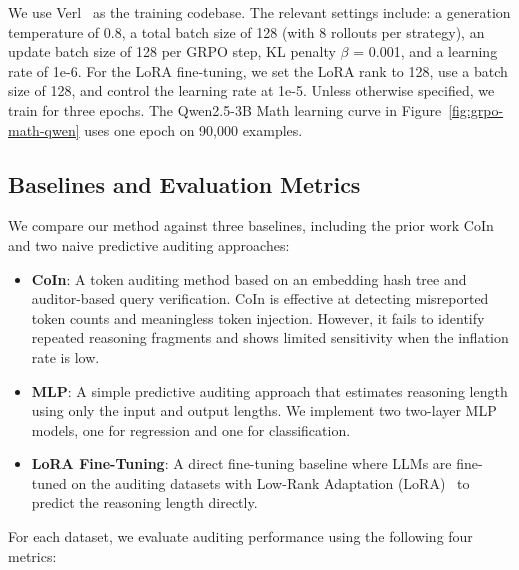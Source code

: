 \documentclass[pdflatex,sn-mathphys-num]{sn-jnl}%
\theoremstyle{thmstyleone}%
\theoremstyle{thmstyletwo}%
\theoremstyle{thmstylethree}%
\begin{document}
We use Verl~\citep{sheng2024hybridflow} as the training codebase. The relevant settings include: a generation temperature of 0.8, a total batch size of 128 (with 8 rollouts per strategy), an update batch size of 128 per GRPO step, KL penalty $\beta$ = 0.001, and a learning rate of 1e-6. 
For the LoRA fine-tuning, we set the LoRA rank to 128, use a batch size of 128, and control the learning rate at 1e-5.
Unless otherwise specified, we train for three epochs. The Qwen2.5-3B Math learning curve in Figure~\ref{fig:grpo-math-qwen} uses one epoch on 90,000 examples.

\subsection{Baselines and Evaluation Metrics}
We compare our method against three baselines, including the prior work CoIn~\citep{sun2025coin} and two naive predictive auditing approaches:
\begin{itemize}
\item \textbf{CoIn}: A token auditing method based on an embedding hash tree and auditor-based query verification. CoIn is effective at detecting misreported token counts and meaningless token injection. However, it fails to identify repeated reasoning fragments and shows limited sensitivity when the inflation rate is low.
\item \textbf{MLP}: A simple predictive auditing approach that estimates reasoning length using only the input and output lengths. We implement two two-layer MLP models, one for regression and one for classification.
\item \textbf{LoRA Fine-Tuning}: A direct fine-tuning baseline where LLMs are fine-tuned on the auditing datasets with Low-Rank Adaptation (LoRA)~\citep{hu2022lora} to predict the reasoning length directly.
\end{itemize}
For each dataset, we evaluate auditing performance using the following four metrics:
\end{document}
